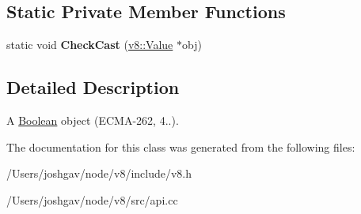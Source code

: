 \subsection*{Static Private Member Functions}
\begin{DoxyCompactItemize}
\item 
static void {\bfseries Check\+Cast} (\hyperlink{classv8_1_1_value}{v8\+::\+Value} $\ast$obj)\hypertarget{classv8_1_1_boolean_object_a3ef9758674654835f389f2a8cdeb4b4a}{}\label{classv8_1_1_boolean_object_a3ef9758674654835f389f2a8cdeb4b4a}

\end{DoxyCompactItemize}


\subsection{Detailed Description}
A \hyperlink{classv8_1_1_boolean}{Boolean} object (E\+C\+M\+A-\/262, 4..). 

The documentation for this class was generated from the following files\+:\begin{DoxyCompactItemize}
\item 
/\+Users/joshgav/node/v8/include/v8.\+h\item 
/\+Users/joshgav/node/v8/src/api.\+cc\end{DoxyCompactItemize}
